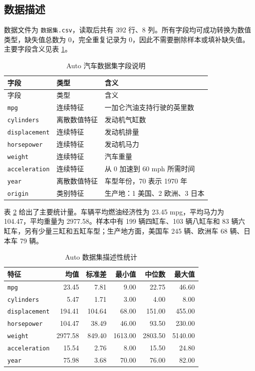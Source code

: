 \documentclass[UTF8,a4paper,12pt]{ctexart}
\begin{document}
\subsection{数据描述}

数据文件为 \texttt{数据集.csv}，读取后共有 392 行、8 列。所有字段均可成功转换为数值类型，缺失值总数为 0，完全重复记录为 0，因此不需要删除样本或填补缺失值。主要字段含义见表 \ref{tab:features}。

\begin{longtable}{lll}
\caption{Auto 汽车数据集字段说明}\label{tab:features}\\
\toprule
字段 & 类型 & 含义\\
\midrule
\endfirsthead
\toprule
字段 & 类型 & 含义\\
\midrule
\endhead
\texttt{mpg} & 连续特征 & 一加仑汽油支持行驶的英里数\\
\texttt{cylinders} & 离散数值特征 & 发动机气缸数\\
\texttt{displacement} & 连续特征 & 发动机排量\\
\texttt{horsepower} & 连续特征 & 发动机马力\\
\texttt{weight} & 连续特征 & 汽车重量\\
\texttt{acceleration} & 连续特征 & 从 0 加速到 60 mph 所需时间\\
\texttt{year} & 离散数值特征 & 车型年份，70 表示 1970 年\\
\texttt{origin} & 类别特征 & 生产地：1 美国、2 欧洲、3 日本\\
\bottomrule
\end{longtable}

表 \ref{tab:describe} 给出了主要统计量。车辆平均燃油经济性为 23.45 mpg，平均马力为 104.47，平均重量为 2977.58。样本中有 199 辆四缸车、103 辆八缸车和 83 辆六缸车，另有少量三缸和五缸车型；生产地方面，美国车 245 辆、欧洲车 68 辆、日本车 79 辆。

\begin{table}[H]
\centering
\caption{Auto 数据集描述性统计}
\label{tab:describe}
\small
\begin{tabular}{lrrrrr}
\toprule
特征 & 均值 & 标准差 & 最小值 & 中位数 & 最大值\\
\midrule
\texttt{mpg} & 23.45 & 7.81 & 9.00 & 22.75 & 46.60\\
\texttt{cylinders} & 5.47 & 1.71 & 3.00 & 4.00 & 8.00\\
\texttt{displacement} & 194.41 & 104.64 & 68.00 & 151.00 & 455.00\\
\texttt{horsepower} & 104.47 & 38.49 & 46.00 & 93.50 & 230.00\\
\texttt{weight} & 2977.58 & 849.40 & 1613.00 & 2803.50 & 5140.00\\
\texttt{acceleration} & 15.54 & 2.76 & 8.00 & 15.50 & 24.80\\
\texttt{year} & 75.98 & 3.68 & 70.00 & 76.00 & 82.00\\
\bottomrule
\end{tabular}
\end{table}
\end{document}
